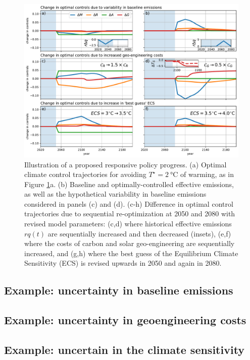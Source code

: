 \documentclass[9pt,twocolumn,twoside,lineno]{pnas-new}
\begin{document}
\begin{figure}%
\centering
\includegraphics[width=11.4cm]{figures/policy_updates.pdf}
\caption{Illustration of a proposed responsive policy progress. (a) Optimal climate control trajectories for avoiding $T^{\star} = \SI{2}{\celsius}$ of warming, as in Figure \ref{fig:cost-effectiveness}a. (b) Baseline and optimally-controlled effective emissions, as well as the hypothetical variability in baseline emissions considered in panels (c) and (d). (c-h) Difference in optimal control trajectories due to sequential re-optimization at 2050 and 2080 with revised model parameters: (c,d) where historical effective emissions $rq(t)$ are sequentially increased and then decreased (insets), (e,f) where the costs of carbon and solar geo-engineering are sequentially increased, and (g,h) where the best guess of the Equilibrium Climate Sensitivity (ECS) is revised upwards in 2050 and again in 2080.}
\label{fig:cost-effectiveness}
\end{figure}

\subsection*{Example: uncertainty in baseline emissions}

\subsection*{Example: uncertainty in geoengineering costs}

\subsection*{Example: uncertain in the climate sensitivity}
\end{document}
